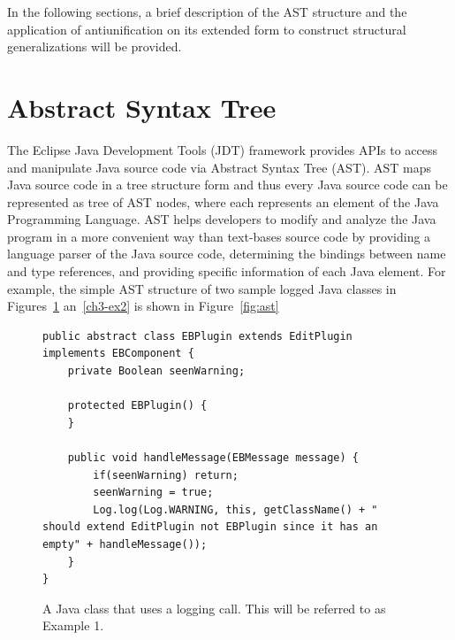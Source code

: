 In the following sections, a brief description of the AST structure and the application of antiunification on its extended form to construct structural generalizations will be provided.

\section{Abstract Syntax Tree}   \label{AST}

The Eclipse Java Development Tools (JDT) framework provides APIs to access and manipulate Java source code via Abstract Syntax Tree (AST). AST maps Java source code in a tree structure form and thus every Java source code can be represented as tree of AST nodes, where each represents an element of the Java Programming Language. AST helps developers to modify and analyze the Java program in a more convenient way than text-bases source code by providing a language parser of the Java source code, determining the bindings between name and type references, and providing specific information of each Java element. For example, the simple AST structure of two sample logged Java classes in Figures~\ref{ch3-ex1} an~\ref{ch3-ex2} is shown in Figure~\ref{fig:ast}


\begin{figure}[H]
\def\baselinestretch{1}
\begin{lstlisting}
public abstract class EBPlugin extends EditPlugin implements EBComponent {
    private Boolean seenWarning;
  
    protected EBPlugin() {
    }

    public void handleMessage(EBMessage message) {
        if(seenWarning) return;
        seenWarning = true;
        Log.log(Log.WARNING, this, getClassName() + " should extend EditPlugin not EBPlugin since it has an empty" + handleMessage());
    }
}
\end{lstlisting}
\caption{A Java class that uses a logging call. This will be referred to as Example 1.\label{ch3-ex1}}
\end{figure}


